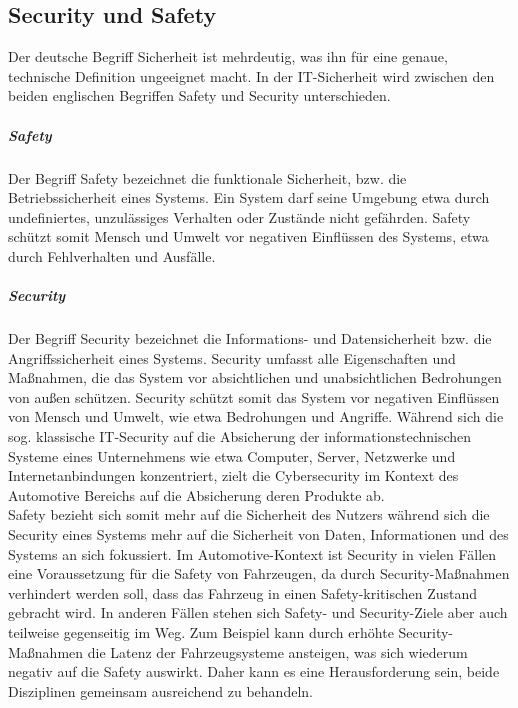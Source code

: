 \subsection{Security und Safety}
Der deutsche Begriff \glqq Sicherheit\grqq{} ist mehrdeutig, was ihn für eine genaue, technische Definition ungeeignet macht. In der IT-Sicherheit wird zwischen den beiden englischen Begriffen \glqq Safety\grqq{} und \glqq Security\grqq{} unterschieden.
\subparagraph{Safety}
\glqq Der Begriff Safety bezeichnet die funktionale Sicherheit, bzw. die Betriebssicherheit eines Systems. Ein System darf seine Umgebung etwa durch undefiniertes, unzulässiges Verhalten oder Zustände nicht gefährden. Safety schützt somit Mensch und Umwelt vor negativen Einflüssen des Systems, etwa durch Fehlverhalten und Ausfälle.\grqq{} \cite[2]{Wurm.2022}
\subparagraph{Security}
\glqq Der Begriff Security bezeichnet die Informations- und Datensicherheit bzw. die Angriffssicherheit eines Systems. Security umfasst alle Eigenschaften und Maßnahmen, die das System vor absichtlichen und unabsichtlichen Bedrohungen
von außen schützen. Security schützt somit das System vor negativen Einflüssen von Mensch und Umwelt, wie etwa Bedrohungen und Angriffe. Während sich die sog. klassische IT-Security auf die Absicherung der informationstechnischen Systeme eines Unternehmens wie etwa Computer, Server, Netzwerke und Internetanbindungen konzentriert, zielt die Cybersecurity im Kontext des Automotive Bereichs auf die Absicherung deren Produkte ab.\grqq{} \cite[2\psq]{Wurm.2022}\\

Safety bezieht sich somit mehr auf die Sicherheit des Nutzers während sich die Security eines Systems mehr auf die Sicherheit von Daten, Informationen und des Systems an sich fokussiert. Im Automotive-Kontext ist Security in vielen Fällen eine Voraussetzung für die Safety von Fahrzeugen, da durch Security-Maßnahmen verhindert werden soll, dass das Fahrzeug in einen Safety-kritischen Zustand gebracht wird. In anderen Fällen stehen sich Safety- und Security-Ziele aber auch teilweise gegenseitig im Weg. Zum Beispiel kann durch erhöhte Security-Maßnahmen die Latenz der Fahrzeugsysteme ansteigen, was sich wiederum negativ auf die Safety auswirkt. Daher kann es eine Herausforderung sein, beide Disziplinen gemeinsam ausreichend zu behandeln.


